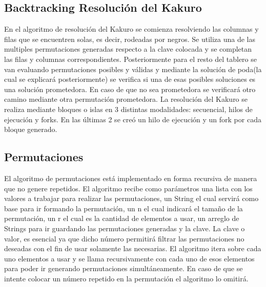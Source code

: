\documentclass[conference]{IEEEtran}
\begin{document}
\subsection{Backtracking Resolución del Kakuro}

En el algoritmo de resolución del Kakuro se comienza resolviendo las columnas y filas que se encuentren solas, es decir, rodeadas por negros. Se utiliza una de las multiples permutaciones generadas respecto a la clave colocada y se completan las filas y columnas correspondientes. Posteriormente para el resto del tablero se van evaluando permutaciones posibles y válidas y mediante la solución de poda(la cual se explicará posteriormente) se verifica si una de esas posibles soluciones es una solución prometedora. En caso de que no sea prometedora se verificará otro camino mediante otra permutación prometedora. La resolución del Kakuro se realiza mediante bloques o islas en 3 distintas modalidades: secuencial, hilos de ejecución y forks. En las últimas 2 se creó un hilo de ejecución y un fork por cada bloque generado.

\subsection{Permutaciones}
El algoritmo de permutaciones está implementado en forma recursiva de manera que no genere repetidos. El algoritmo recibe como parámetros una lista con los valores a trabajar para realizar las permutaciones, un String el cual servirá como base para ir formando la permutación, un n el cual indicará el tamaño de la permutación, un r el cual es la cantidad de elementos a usar, un arreglo de Strings para ir guardando las permutaciones generadas y la clave. La clave o valor, es esencial ya que dicho número permitirá filtrar las permutaciones no deseadas con el fin de usar solamente las necesarias. El algoritmo itera sobre cada uno elementos a usar y se llama recursivamente con cada uno de esos elementos para poder ir generando permutaciones simultáneamente. En caso de que se intente colocar un número repetido en la permutación el algoritmo lo omitirá.
\end{document}
